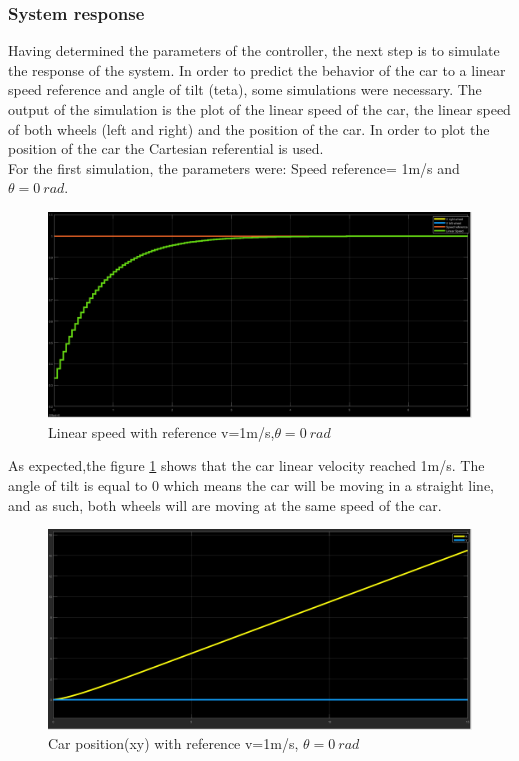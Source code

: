 \subsubsection{System response}
\label{sec:des-sim-res}
Having determined the parameters of the controller, the next step is to simulate the response of the system.
In order to predict the behavior of the car to a linear speed reference and angle of tilt (teta), some simulations were necessary. The output of the simulation is the plot of the linear speed of the car, the linear speed of both wheels (left and right) and the position of the car.
In order to plot the position of the car the Cartesian referential is used.\\
For the first simulation, the parameters were: Speed reference= 1m/s and $\theta = 0~\si{rad}$.\\
\begin{figure}[!h]
\centering
\includegraphics[width=1.0\textwidth]{./img/vel10.png}
\caption {\label{fig:sim1 - vel}Linear speed with reference v=1m/s,$\theta = 0~\si{rad}$}
\end{figure}
 As expected,the figure \ref{fig:sim1 - vel} shows that the car linear velocity reached 1m/s. The angle of tilt is equal to 0 which means the car will be moving in a straight line, and as such, both wheels will are moving at the same speed of the car.\\
\newpage
\begin{figure}[!h]
\centering
\includegraphics[width=1.0\textwidth]{./img/xy10.png}
\caption {\label{fig:sim1 - pos}Car position(xy) with reference v=1m/s, $\theta = 0~\si{rad}$}
\end{figure}
